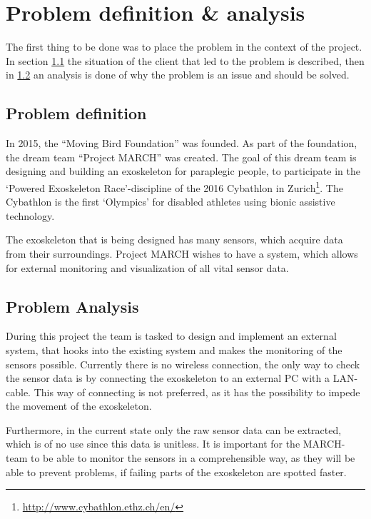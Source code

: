 \section{Problem definition \& analysis} \label{sec:probdef}
The first thing to be done was to place the problem in the context of the project. In section \ref{sec:prodef} the situation of the client that led to the problem is described, then in \ref{sec:proana} an analysis is done of why the problem is an issue and should be solved.

\subsection{Problem definition}\label{sec:prodef}
In 2015, the ``Moving Bird Foundation'' was founded. As part of the foundation, the dream team ``Project MARCH'' was created. The goal of this dream team is designing and building an exoskeleton for paraplegic people, to participate in the `Powered Exoskeleton Race'-discipline of the 2016 Cybathlon in Zurich\footnote{\url{http://www.cybathlon.ethz.ch/en/}}. The Cybathlon is the first `Olympics' for disabled athletes using bionic assistive technology.
 
The exoskeleton that is being designed has many sensors, which acquire data from their surroundings. Project MARCH wishes to have a system, which allows for external monitoring and visualization of all vital sensor data.

\subsection{Problem Analysis}\label{sec:proana}
During this project the team is tasked to design and implement an external system, that hooks into the existing system and makes the monitoring of the sensors possible. Currently there is no wireless connection, the only way to check the sensor data is by connecting the exoskeleton to an external PC with a LAN-cable. This way of connecting is not preferred, as it has the possibility to impede the movement of the exoskeleton.

Furthermore, in the current state only the raw sensor data can be extracted, which is of no use since this data is unitless. It is important for the MARCH-team to be able to monitor the sensors in a comprehensible way, as they will be able to prevent problems, if failing parts of the exoskeleton are spotted faster.